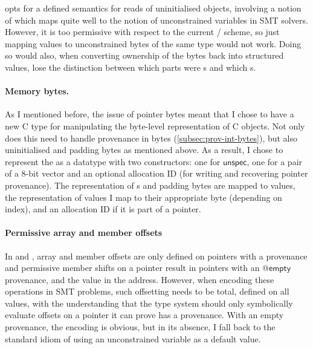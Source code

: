  opts for a defined semantics for reads of uninitialised objects,
involving a notion of  which maps quite well to
the notion of unconstrained variables in SMT solvers. However, it is too
permissive with respect to the current /
scheme, so just mapping  values to unconstrained
 bytes of the same type would not work. Doing so would also,
when converting ownership of the bytes back into structured values, lose the
distinction between which parts were s and which
s.

\paragraph{Memory bytes.}%
As I mentioned before, the issue of pointer bytes meant that I chose to have a
new C type for manipulating the byte-level representation of C objects. Not
only does this need to handle provenance in bytes
(\cref{subsec:prov-int-bytes}), but also uninitialised and padding bytes as
mentioned above. As a result, I chose to represent the  as
a datatype with two constructors: one for $\mathsf{unspec}$, one for a pair of
a 8-bit vector and an optional allocation ID (for writing and recovering
pointer provenance). The representation of s and padding bytes
are mapped to  values, the representation of 
values I map to their appropriate byte (depending on
index), and an allocation ID if it is part of a pointer.

\paragraph{Permissive array and member offsets}%
In  and , array and member offsets are only defined on
pointers with a provenance and permissive member shifts on a 
pointer result in pointers with an $@\mathsf{empty}$ provenance, and the
 value in the address. However, when encoding these
operations in SMT problems, such offsetting needs to be total, defined on all
values, with the understanding that the type system should only symbolically
evaluate offsets on a pointer it can prove has a provenance. With an empty
provenance, the encoding is obvious, but in its absence, I fall back to the
standard idiom of using an unconstrained variable as a default value.

